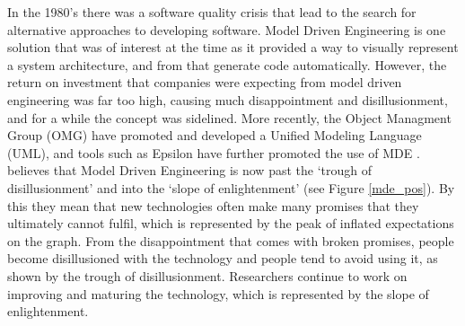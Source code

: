 In the 1980's there was a software quality crisis that lead to the search for alternative approaches to developing software. Model Driven Engineering is one solution that was of interest at the time as it provided a way to visually represent a system architecture, and from that generate code automatically. However, the return on investment that companies were expecting from model driven engineering was far too high, causing much disappointment and disillusionment, and for a while the concept was sidelined. More recently, the Object Managment Group (OMG) have promoted and developed a Unified Modeling Language (UML), and tools such as Epsilon have further promoted the use of MDE \citep{mdeHistory}.  \citet{brambillaBook} believes that Model Driven Engineering is now past the `trough of disillusionment' and into the `slope of enlightenment' (see Figure \ref{mde_pos}). By this they mean that new technologies often make many promises that they ultimately cannot fulfil, which is represented by the peak of inflated expectations on the graph. From the disappointment that comes with broken promises, people become disillusioned with the technology and people tend to avoid using it, as shown by the trough of disillusionment. Researchers continue to work on improving and maturing the technology, which is represented by the slope of enlightenment. \\

